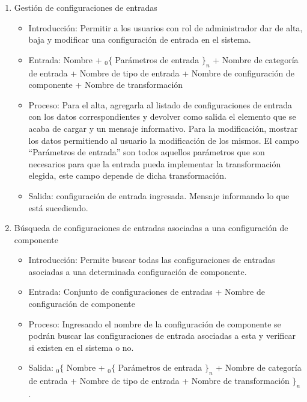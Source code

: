 \begin{enumerate}
			\item Gestión de configuraciones de entradas
				\begin{itemize}
					\item Introducción: Permitir a los usuarios con rol de administrador dar de alta, baja y modificar una configuración de entrada en el sistema.
					\item Entrada: Nombre + ${}_{0}\{$ Parámetros de entrada $\}_n$ + Nombre de categoría de entrada + Nombre de tipo de entrada + Nombre de configuración de componente + Nombre de transformación
					\item Proceso: Para el alta, agregarla al listado de configuraciones de entrada con los datos correspondientes y devolver como salida el elemento que se acaba de cargar y un mensaje informativo.
					Para la modificación, mostrar los datos permitiendo al usuario la modificación de los mismos.
					El campo ``Parámetros de entrada'' son todos aquellos parámetros que son necesarios para que la entrada pueda implementar la transformación elegida, este campo depende de dicha transformación.
					\item Salida: configuración de entrada ingresada. Mensaje informando lo que está sucediendo.
				\end{itemize}
			
			\item Búsqueda de configuraciones de entradas asociadas a una configuración de componente
				\begin{itemize}
					\item Introducción: Permite buscar todas las configuraciones de entradas asociadas a una determinada configuración de componente.
					\item Entrada: Conjunto de configuraciones de entradas + Nombre de configuración de componente
					\item Proceso: Ingresando el nombre de la configuración de componente se podrán buscar las configuraciones de entrada asociadas a esta y verificar si existen en el sistema o no.
					\item Salida: ${}_{0}\{$ Nombre + ${}_{0}\{$ Parámetros de entrada $\}_n$ + Nombre de categoría de entrada + Nombre de tipo de entrada + Nombre de transformación $\}_n$.
				\end{itemize}


\end{enumerate}
